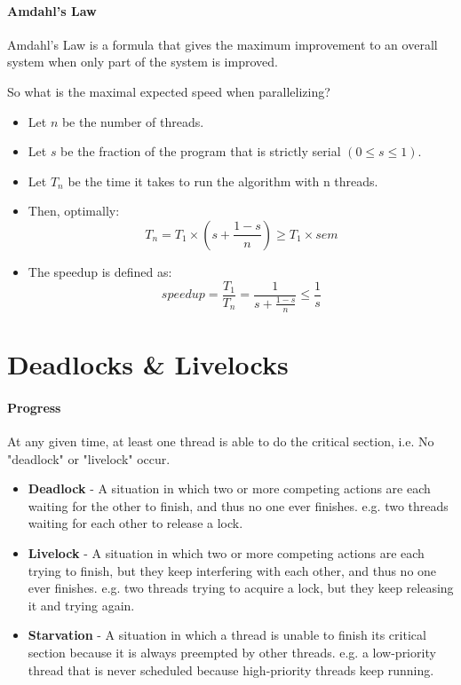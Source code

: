 \documentclass[openany,12pt]{book}
\begin{document}
\paragraph{Amdahl's Law} Amdahl's Law is a formula that gives the maximum improvement to an overall system when only part of the system is improved.\par
So what is the maximal expected speed when parallelizing?
\begin{itemize}
  \item Let \(n\) be the number of threads.
  \item Let \(s\) be the fraction of the program that is strictly serial \((0\leq s \leq 1)\).
  \item Let \(T_n\) be the time it takes to run the algorithm with n threads.
  \item Then, optimally:
        \begin{equation*}
          T_n = T_1 \times \left( s + \frac{1-s}{n} \right) \geq T_1 \times sem
        \end{equation*}
  \item The speedup is defined as:
        \begin{equation*}
          speedup = \frac{T_1}{T_n} = \frac{1}{s + \frac{1-s}{n}} \leq \frac{1}{s}
        \end{equation*}
\end{itemize}


\newpage
\section*{Deadlocks \& Livelocks}

\paragraph{Progress} At any given time, at least one thread is able to do the critical section, i.e. No "deadlock" or "livelock" occur.
\begin{itemize}
  \item \textbf{Deadlock} - A situation in which two or more competing actions are each waiting for the other to finish, and thus no one ever finishes. e.g. two threads waiting for each other to release a lock.

  \item \textbf{Livelock} - A situation in which two or more competing actions are each trying to finish, but they keep interfering with each other, and thus no one ever finishes. e.g. two threads trying to acquire a lock, but they keep releasing it and trying again.

  \item \textbf{Starvation} - A situation in which a thread is unable to finish its critical section because it is always preempted by other threads. e.g. a low-priority thread that is never scheduled because high-priority threads keep running.
\end{itemize}
\end{document}
